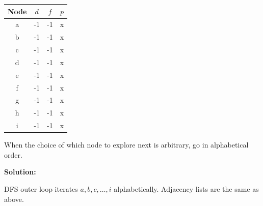 \documentclass[addpoints]{exam}
\begin{document}
\begin{questions}
\begin{parts}
\begin{tabular}{c | c | c | c}
Node & $d$ & $f$ & $p$ \\
\hline
a & -1 & -1 & x \\
b & -1 & -1 & x \\
c & -1 & -1 & x \\
d & -1 & -1 & x \\
e & -1 & -1 & x \\
f & -1 & -1 & x \\
g & -1 & -1 & x \\
h & -1 & -1 & x \\
i & -1 & -1 & x \\
\end{tabular}

When the choice of which node to explore next is arbitrary, go in alphabetical order.

\textbf{Solution:}

DFS outer loop iterates $a, b, c, \ldots, i$ alphabetically. Adjacency lists are the same as above.


\end{parts}
\end{questions}
\end{document}
